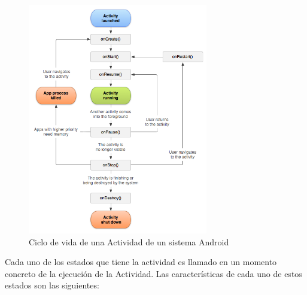 \begin{figure}[h]

\centering
\includegraphics[width=0.7\textwidth]{./Imagenes/Bitmap/Ciclo_de_vida_Android}
\caption{Ciclo de vida de una Actividad de un sistema Android}
\end{figure}

Cada uno de los estados que tiene la actividad es llamado en un momento concreto de la ejecuci\'on de la Actividad. Las caracter\'isticas de cada uno de estos estados son las siguientes:

